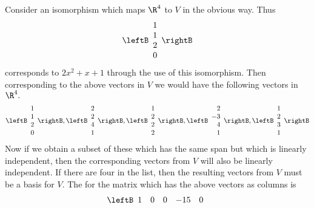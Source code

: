 \begin{solution}
Consider an isomorphism which maps $\R%
^{4}$ to $V$ in the obvious way. Thus 
\begin{equation*}
\leftB 
\begin{array}{c}
1 \\ 
1 \\ 
2 \\ 
0
\end{array}
\rightB
\end{equation*}
corresponds to $2x^{2}+x+1$ through the use of this isomorphism. Then
corresponding to the above vectors in $V$ we would have the following
vectors in $\R^{4}.$ 
\begin{equation*}
\leftB 
\begin{array}{c}
1 \\ 
1 \\ 
2 \\ 
0
\end{array}
\rightB ,\leftB 
\begin{array}{c}
2 \\ 
2 \\ 
4 \\ 
1
\end{array}
\rightB ,\leftB 
\begin{array}{c}
1 \\ 
2 \\ 
2 \\ 
2
\end{array}
\rightB ,\leftB 
\begin{array}{r}
2 \\ 
-3 \\ 
4 \\ 
1
\end{array}
\rightB ,\leftB 
\begin{array}{c}
1 \\ 
2 \\ 
3 \\ 
1
\end{array}
\rightB
\end{equation*}
Now if we obtain a subset of these which has the same span but which is
linearly independent, then the corresponding vectors from $V$ will also be
linearly independent. If there are four
in the list, then the resulting vectors from $V$ must be a basis for $V$.
The {\rref} for the matrix which has the above vectors as
columns is 
\begin{equation*}
\leftB 
\begin{array}{rrrrr}
1 & 0 & 0 & -15 & 0 \\ 

\end{array}
\end{equation*}
\end{solution}
